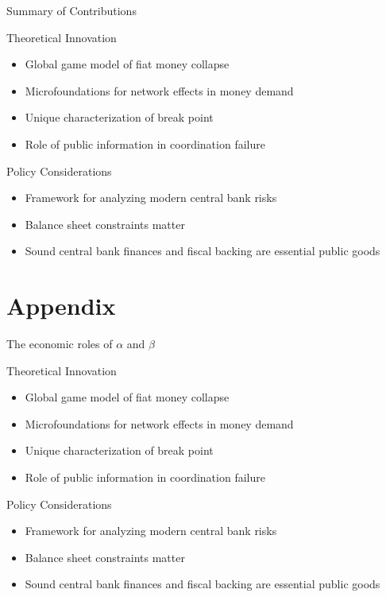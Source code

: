 \documentclass[aspectratio=169, xcolor=table]{beamer}
\begin{document}
\begin{frame}{Summary of Contributions}
  \begin{block}{Theoretical Innovation}
    \begin{itemize}
      \item Global game model of fiat money collapse
      \item Microfoundations for network effects in money demand
      \item Unique characterization of break point
      \item Role of public information in coordination failure
    \end{itemize}
  \end{block}

  \begin{block}{Policy Considerations}
    \begin{itemize}
      \item Framework for analyzing modern central bank risks
      \item Balance sheet constraints matter
      \item Sound central bank finances and fiscal backing are essential public goods
    \end{itemize}
  \end{block}
\end{frame}

\section{Appendix}

\begin{frame}{The economic roles of $\alpha$ and $\beta$}
  \begin{block}{Theoretical Innovation}
    \begin{itemize}
      \item Global game model of fiat money collapse
      \item Microfoundations for network effects in money demand
      \item Unique characterization of break point
      \item Role of public information in coordination failure
    \end{itemize}
  \end{block}

  \begin{block}{Policy Considerations}
    \begin{itemize}
      \item Framework for analyzing modern central bank risks
      \item Balance sheet constraints matter
      \item Sound central bank finances and fiscal backing are essential public goods
    \end{itemize}
  \end{block}
\end{frame}
\end{document}
